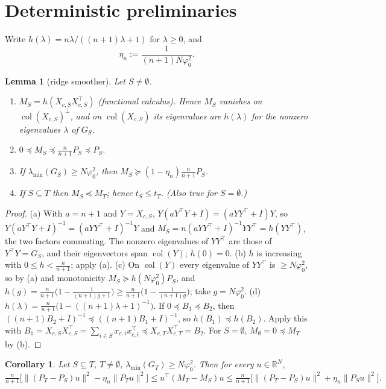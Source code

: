 \documentclass[11pt]{article}
\newtheorem{lemma}[theorem]{Lemma}
\newtheorem{corollary}[theorem]{Corollary}
\theoremstyle{definition}
\newcommand{\1}{\mathbf 1}
\newcommand{\R}{\mathbb R}
\newcommand{\vp}{\varphi_0^2}
\newcommand{\tr}{^{\top}}
\begin{document}
\section{Deterministic preliminaries}\label{sec:det}

Write $h(\lambda)=n\lambda/((n+1)\lambda+1)$ for $\lambda\ge0$, and
\[
\eta_n:=\frac{1}{(n+1)N\vp}.
\]

\begin{lemma}[ridge smoother]\label{lem:smoother}
Let $S\ne\emptyset$.
\begin{enumerate}
\item[(a)] $M_S=h(X_{c,S}X_{c,S}\tr)$ (functional calculus). Hence $M_S$ vanishes on $\operatorname{col}(X_{c,S})^\perp$, and on $\operatorname{col}(X_{c,S})$ its eigenvalues are $h(\lambda)$ for the nonzero eigenvalues $\lambda$ of $G_S$.
\item[(b)] $0\preceq M_S\preceq\frac{n}{n+1}P_S\preceq P_S$.
\item[(c)] If $\lambda_{\min}(G_S)\ge N\vp$, then $M_S\succeq(1-\eta_n)\frac n{n+1}P_S$.
\item[(d)] If $S\subseteq T$ then $M_S\preceq M_T$; hence $t_S\le t_T$. (Also true for $S=\emptyset$.)
\end{enumerate}
\end{lemma}

\begin{proof}
(a) With $a=n+1$ and $Y=X_{c,S}$, $Y(aY\tr Y+I)=(aYY\tr+I)Y$, so $Y(aY\tr Y+I)^{-1}=(aYY\tr+I)^{-1}Y$ and $M_S=n(aYY\tr+I)^{-1}YY\tr=h(YY\tr)$, the two factors commuting. The nonzero eigenvalues of $YY\tr$ are those of $Y\tr Y=G_S$, and their eigenvectors span $\operatorname{col}(Y)$; $h(0)=0$.
(b) $h$ is increasing with $0\le h<\frac n{n+1}$; apply (a).
(c) On $\operatorname{col}(Y)$ every eigenvalue of $YY\tr$ is $\ge N\vp$, so by (a) and monotonicity $M_S\succeq h(N\vp)P_S$, and $h(g)=\frac n{n+1}\big(1-\frac1{(n+1)g+1}\big)\ge\frac n{n+1}\big(1-\frac1{(n+1)g}\big)$; take $g=N\vp$.
(d) $h(\lambda)=\frac n{n+1}\big(1-((n+1)\lambda+1)^{-1}\big)$. If $0\preceq B_1\preceq B_2$, then $((n+1)B_2+I)^{-1}\preceq((n+1)B_1+I)^{-1}$, so $h(B_1)\preceq h(B_2)$. Apply this with $B_1=X_{c,S}X_{c,S}\tr=\sum_{i\in S}x_{c,i}x_{c,i}\tr\preceq X_{c,T}X_{c,T}\tr=B_2$. For $S=\emptyset$, $M_\emptyset=0\preceq M_T$ by (b).
\end{proof}

\begin{corollary}\label{cor:diff}
Let $S\subseteq T$, $T\ne\emptyset$, $\lambda_{\min}(G_T)\ge N\vp$. Then for every $u\in\R^N$,
\[
\tfrac n{n+1}\big[\|(P_T-P_S)u\|^2-\eta_n\|P_Tu\|^2\big]\le u\tr(M_T-M_S)u\le\tfrac n{n+1}\big[\|(P_T-P_S)u\|^2+\eta_n\|P_Su\|^2\big].
\]
\end{corollary}
\end{document}
